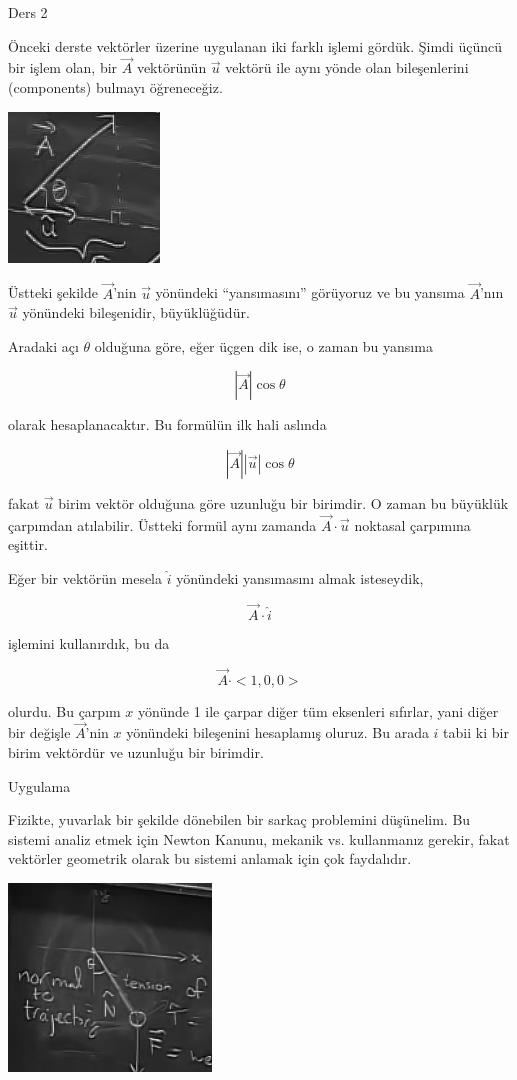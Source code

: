 \documentclass[12pt,fleqn]{article}\usepackage{../../common}
\begin{document}
Ders 2


Önceki derste vektörler üzerine uygulanan iki farklı işlemi gördük. Şimdi üçüncü
bir işlem olan, bir $\vec{A}$ vektörünün $\vec{u}$ vektörü ile aynı yönde olan
bileşenlerini (components) bulmayı öğreneceğiz.

\includegraphics[height=4cm]{2_1.png}

Üstteki şekilde $\vec{A}$'nin $\vec{u}$ yönündeki ``yansımasını'' görüyoruz ve
bu yansıma $\vec{A}$'nın $\vec{u}$ yönündeki bileşenidir, büyüklüğüdür.

Aradaki açı $\theta$ olduğuna göre, eğer üçgen dik ise, o zaman bu yansıma

$$ |\vec{A}| \cos \theta $$

olarak hesaplanacaktır. Bu formülün ilk hali aslında

$$ |\vec{A}| |\vec{u}| \cos \theta $$

fakat $\vec{u}$ birim vektör olduğuna göre uzunluğu bir birimdir. O zaman bu
büyüklük çarpımdan atılabilir.  Üstteki formül aynı zamanda
$\vec{A}\cdot\vec{u}$ noktasal çarpımına eşittir.

Eğer bir vektörün mesela $\hat{i}$ yönündeki yansımasını almak isteseydik,

$$ \vec{A} \cdot \hat{i} $$

işlemini kullanırdık, bu da

$$ \vec{A} \cdot <1,0,0>$$

olurdu. Bu çarpım $x$ yönünde 1 ile çarpar diğer tüm eksenleri sıfırlar, yani
diğer bir değişle $\vec{A}$'nin $x$ yönündeki bileşenini hesaplamış oluruz. Bu
arada $\hat{i}$ tabii ki bir birim vektördür ve uzunluğu bir birimdir.


Uygulama

Fizikte, yuvarlak bir şekilde dönebilen bir sarkaç problemini düşünelim. Bu
sistemi analiz etmek için Newton Kanunu, mekanik vs. kullanmanız gerekir, fakat 
vektörler geometrik olarak bu sistemi anlamak için çok faydalıdır.

\includegraphics[height=5cm]{2_2.png}
\end{document}
